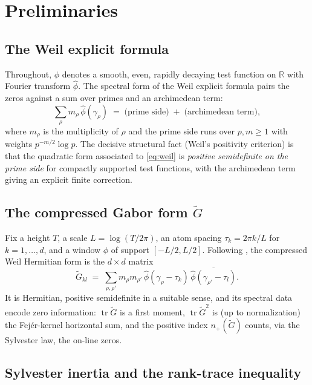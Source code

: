 \documentclass[11pt]{article}
\newcommand{\R}{\mathbb{R}}
\newcommand{\tr}{\operatorname{tr}}
\begin{document}
\section{Preliminaries}

\subsection{The Weil explicit formula}

Throughout, $\phi$ denotes a smooth, even, rapidly decaying test function on $\R$ with Fourier transform $\hat\phi$. The spectral form of the Weil explicit formula pairs the zeros against a sum over primes and an archimedean term:
\begin{equation}
\sum_{\rho} m_\rho\,\hat\phi(\gamma_\rho)
\;=\;
\text{(prime side)}
\;+\;
\text{(archimedean term)},
\label{eq:weil}
\end{equation}
where $m_\rho$ is the multiplicity of $\rho$ and the prime side runs over $p,m\ge 1$ with weights $p^{-m/2}\log p$. The decisive structural fact (Weil's positivity criterion) is that the quadratic form associated to \eqref{eq:weil} is \emph{positive semidefinite on the prime side} for compactly supported test functions, with the archimedean term giving an explicit finite correction.

\subsection{The compressed Gabor form \texorpdfstring{$\tilde G$}{}}

Fix a height $T$, a scale $L=\log(T/2\pi)$, an atom spacing $\tau_k=2\pi k/L$ for $k=1,\dots,d$, and a window $\phi$ of support $[-L/2,L/2]$. Following \cite{anthropic}, the compressed Weil Hermitian form is the $d\times d$ matrix
\begin{equation}
\tilde G_{kl}
\;=\;
\sum_{\rho,\rho'} m_\rho m_{\rho'}\,
\hat\phi(\gamma_\rho-\tau_k)\,
\overline{\hat\phi(\gamma_{\rho'}-\tau_l)}.
\label{eq:Gdef}
\end{equation}
It is Hermitian, positive semidefinite in a suitable sense, and its spectral data encode zero information: $\tr\tilde G$ is a first moment, $\tr\tilde G^2$ is (up to normalization) the Fejér-kernel horizontal sum, and the positive index $n_+(\tilde G)$ counts, via the Sylvester law, the on-line zeros.

\subsection{Sylvester inertia and the rank-trace inequality}
\end{document}
